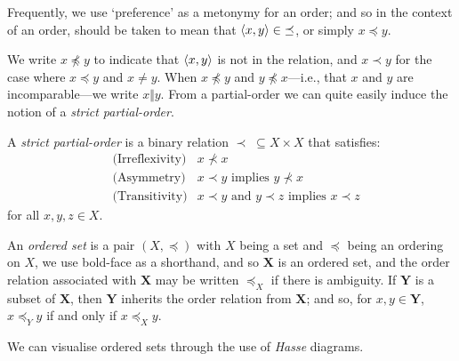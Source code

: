 Frequently, we use `preference' as a metonymy for an order; and so in the context of an order,  should be taken to mean that $\langle x,y \rangle \in \; \preceq$, or simply $x \preceq y$.

We write $x \npreceq y$ to indicate that $\langle x,y \rangle$ is not in the relation, and $x \prec y$ for the case where $x\preceq y$ and $x \not = y$. When $x \not \preceq y$ and $y \not \preceq x$---i.e., that $x$ and $y$ are incomparable---we write $x \Vert y$. From a partial-order we can quite easily induce the notion of a \emph{strict partial-order}.

\begin{definition}
  \label{definition:strict-partial-order}
  A \textit{strict partial-order}  is a binary relation $\prec \; \subseteq X \times X$ that satisfies:
  \begin{align}
    & \text{(Irreflexivity)} & x \nprec x \\
    & \text{(Asymmetry)} & x \prec y \text{ implies } y \nprec x \\
    & \text{(Transitivity)} & x \prec y \text{ and } y \prec z \text{ implies } x \prec z
  \end{align}
  for all $x,y,z \in X$.
\end{definition}

An \textit{ordered set} is a pair $(X, \preceq)$ with $X$ being a set and $\preceq$ being an ordering on $X$, we use bold-face as a shorthand, and so $\mathbf{X}$ is an ordered set, and the order relation associated with $\mathbf{X}$ may be written $\preceq_X$ if there is ambiguity. If $\mathbf{Y}$ is a subset of $\mathbf{X}$, then $\mathbf{Y}$ inherits the order relation from $\mathbf{X}$; and so, for $x,y \in \mathbf{Y}$, $x \preceq_Y y$ if and only if $x \preceq_X y$.

We can visualise ordered sets through the use of \textit{Hasse} diagrams.

